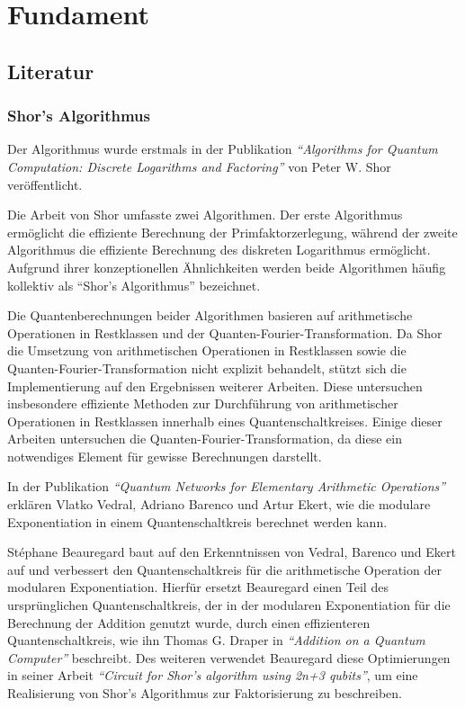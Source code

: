 \section{Fundament}
\subsection{Literatur} 
\subsubsection*{Shor's Algorithmus}
Der Algorithmus wurde erstmals in der Publikation \textit{"`Algorithms for Quantum Computation: Discrete Logarithms and Factoring"'} von Peter W. Shor veröffentlicht.

Die Arbeit von Shor umfasste zwei Algorithmen.
Der erste Algorithmus ermöglicht die effiziente Berechnung der Primfaktorzerlegung, 
während der zweite Algorithmus die effiziente Berechnung des diskreten Logarithmus ermöglicht.
Aufgrund ihrer konzeptionellen Ähnlichkeiten werden beide Algorithmen häufig kollektiv als "`Shor's Algorithmus"' bezeichnet.

Die Quantenberechnungen beider Algorithmen basieren auf arithmetische Operationen in Restklassen und der Quanten-Fourier-Transformation.
Da Shor die Umsetzung von arithmetischen Operationen in Restklassen sowie die Quanten-Fourier-Transformation nicht explizit behandelt,
stützt sich die Implementierung auf den Ergebnissen weiterer Arbeiten. 
Diese untersuchen insbesondere effiziente Methoden zur Durchführung von arithmetischer Operationen in Restklassen innerhalb eines Quantenschaltkreises.
Einige dieser Arbeiten untersuchen die Quanten-Fourier-Transformation, 
da diese ein notwendiges Element für gewisse Berechnungen darstellt.

In der Publikation \textit{"`Quantum Networks for Elementary Arithmetic Operations"'} erklären Vlatko Vedral,  Adriano Barenco und Artur Ekert,
wie die modulare Exponentiation in einem Quantenschaltkreis berechnet werden kann. 

St\'{e}phane Beauregard baut auf den Erkenntnissen von Vedral, Barenco und Ekert auf und
verbessert den Quantenschaltkreis für die arithmetische Operation der modularen Exponentiation.
Hierfür ersetzt Beauregard einen Teil des ursprünglichen Quantenschaltkreis,
der in der modularen Exponentiation für die Berechnung der Addition genutzt wurde, 
durch einen effizienteren Quantenschaltkreis,
wie ihn Thomas G. Draper in \textit{"`Addition on a Quantum Computer"'} beschreibt.
Des weiteren verwendet Beauregard diese Optimierungen in seiner Arbeit \textit{"`Circuit for Shor’s algorithm using 2n+3 qubits"'},
um eine Realisierung von Shor's Algorithmus zur Faktorisierung zu beschreiben.

